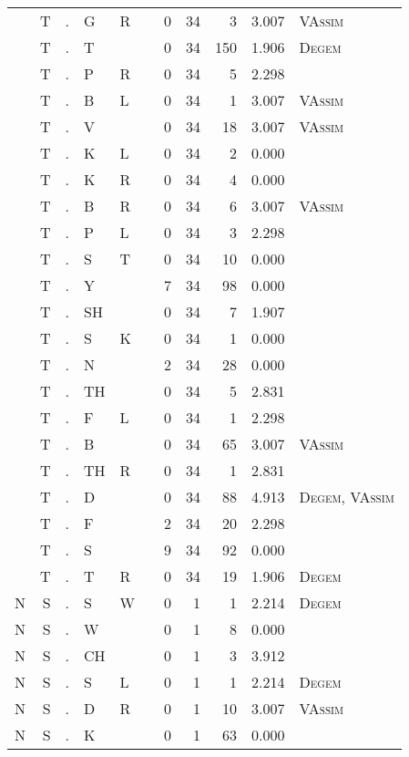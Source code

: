 \begin{longtable}{r@{ } r@{ } c@{ } l@{ } l@{ } l@{ } r r r r l }
 & T & . & G & R &  & 0 & 34 & 3 & 3.007 & \textsc{VAssim} \\
 & T & . & T &  &  & 0 & 34 & 150 & 1.906 & \textsc{Degem} \\
 & T & . & P & R &  & 0 & 34 & 5 & 2.298 &  \\
 & T & . & B & L &  & 0 & 34 & 1 & 3.007 & \textsc{VAssim} \\
 & T & . & V &  &  & 0 & 34 & 18 & 3.007 & \textsc{VAssim} \\
 & T & . & K & L &  & 0 & 34 & 2 & 0.000 &  \\
 & T & . & K & R &  & 0 & 34 & 4 & 0.000 &  \\
 & T & . & B & R &  & 0 & 34 & 6 & 3.007 & \textsc{VAssim} \\
 & T & . & P & L &  & 0 & 34 & 3 & 2.298 &  \\
 & T & . & S & T &  & 0 & 34 & 10 & 0.000 &  \\
 & T & . & Y &  &  & 7 & 34 & 98 & 0.000 &  \\
 & T & . & SH &  &  & 0 & 34 & 7 & 1.907 &  \\
 & T & . & S & K &  & 0 & 34 & 1 & 0.000 &  \\
 & T & . & N &  &  & 2 & 34 & 28 & 0.000 &  \\
 & T & . & TH &  &  & 0 & 34 & 5 & 2.831 &  \\
 & T & . & F & L &  & 0 & 34 & 1 & 2.298 &  \\
 & T & . & B &  &  & 0 & 34 & 65 & 3.007 & \textsc{VAssim} \\
 & T & . & TH & R &  & 0 & 34 & 1 & 2.831 &  \\
 & T & . & D &  &  & 0 & 34 & 88 & 4.913 & \textsc{Degem}, \textsc{VAssim} \\
 & T & . & F &  &  & 2 & 34 & 20 & 2.298 &  \\
 & T & . & S &  &  & 9 & 34 & 92 & 0.000 &  \\
 & T & . & T & R &  & 0 & 34 & 19 & 1.906 & \textsc{Degem} \\
N & S & . & S & W &  & 0 & 1 & 1 & 2.214 & \textsc{Degem} \\
N & S & . & W &  &  & 0 & 1 & 8 & 0.000 &  \\
N & S & . & CH &  &  & 0 & 1 & 3 & 3.912 &  \\
N & S & . & S & L &  & 0 & 1 & 1 & 2.214 & \textsc{Degem} \\
N & S & . & D & R &  & 0 & 1 & 10 & 3.007 & \textsc{VAssim} \\
N & S & . & K &  &  & 0 & 1 & 63 & 0.000 &  \\

\end{longtable}
